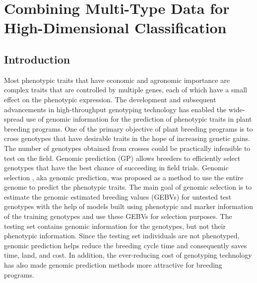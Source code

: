 \chapter{Combining Multi-Type Data for High-Dimensional Classification}
    
\section{Introduction}

Most phenotypic traits that have economic and agronomic importance are complex traits that are controlled by multiple genes, each of which have a small effect on the phenotypic expression. The development and subsequent advancements in  high-throughput genotyping technology has enabled the wide-spread use of genomic information for the prediction of phenotypic traits in plant breeding programs. One of the primary objective of plant breeding programs is to cross genotypes that have desirable traits in the hope of increasing genetic gains. The number of genotypes obtained from crosses could be practically infeasible to test on the field. Genomic prediction (GP) allows breeders to efficiently select genotypes that have the best chance of succeeding in field trials. Genomic selection \cite{meuwissen_prediction_2001}, aka genomic prediction, was proposed as a method to use the entire genome to predict the phenotypic traits. The main goal of genomic selection  is to estimate the genomic estimated breeding values (GEBVs) for untested test genotypes with the help of models built using phenotypic and marker information of the training genotypes and use these GEBVs for selection purposes. The testing set contains genomic information for the genotypes, but not their phenotypic information. Since the testing set individuals are not phenotyped, genomic prediction helps reduce the breeding cycle time and consequently saves time, land, and cost. In addition, the ever-reducing cost of genotyping technology has also made genomic prediction methods more attractive for breeding programs.  \\

